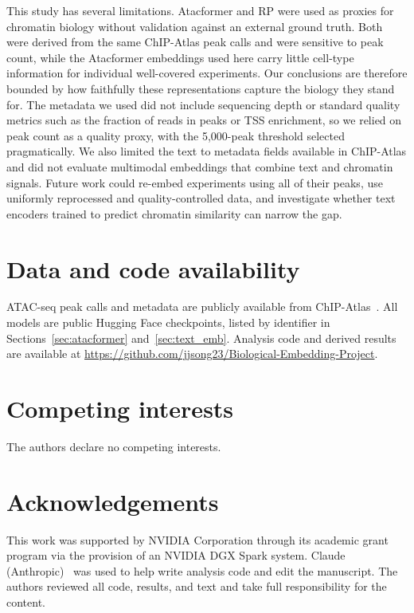 \documentclass[12pt]{article}
\begin{document}
This study has several limitations. Atacformer and RP were used as proxies for
chromatin biology without validation against an external ground truth. Both
were derived from the same ChIP-Atlas peak calls and were sensitive to peak
count, while the Atacformer embeddings used here carry little cell-type
information for individual well-covered experiments. Our conclusions are
therefore bounded by how faithfully these representations capture the biology
they stand for. The metadata we used did not include sequencing depth or
standard quality metrics such as the fraction of reads in peaks or TSS
enrichment, so we relied on peak count as a quality proxy, with the
5,000-peak threshold selected pragmatically. We also limited the text to
metadata fields available in ChIP-Atlas and did not evaluate multimodal
embeddings that combine text and chromatin signals. Future work could re-embed
experiments using all of their peaks, use uniformly reprocessed and
quality-controlled data, and investigate whether text encoders trained to
predict chromatin similarity can narrow the gap.

\section*{Data and code availability}

ATAC-seq peak calls and metadata are publicly available from
ChIP-Atlas~\cite{chipatlas}. All models are public Hugging Face checkpoints,
listed by identifier in Sections~\ref{sec:atacformer}
and~\ref{sec:text_emb}. Analysis code and derived results are available at
\url{https://github.com/jjsong23/Biological-Embedding-Project}.

\section*{Competing interests}

The authors declare no competing interests.

\section*{Acknowledgements}

This work was supported by NVIDIA Corporation through its academic grant
program via the provision of an NVIDIA DGX Spark system. Claude
(Anthropic)~\cite{claude} was used to help write analysis code and edit the
manuscript. The authors reviewed all code, results, and text and take full
responsibility for the content.
\end{document}
